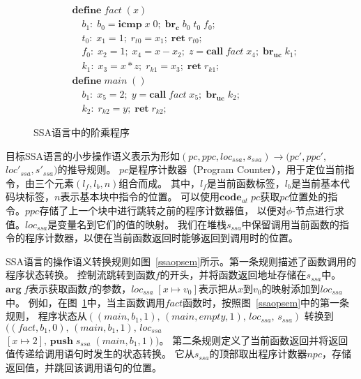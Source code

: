 \begin{figure}[ht]
    \centering
    \begin{equation}
        \nonumber
        \begin{aligned}
            & \mathbf{define}\; fact\; (x)\\
            & \quad b_1:\; b_0 = \mathbf{icmp}\; x\; 0;\; \mathbf{br_c}\; b_0\; t_0\; f_0; \\
            & \quad t_0:\; x_1 = 1;\; r_{t0} = x_1;\; \mathbf{ret}\; r_{t0}; \\
            & \quad f_0:\; x_2 = 1;\; x_4 = x - x_2;\; z = \mathbf{call}\; fact\; x_4;\; \mathbf{br_{uc}}\; k_1; \\
            & \quad k_1:\; x_3 = x*z;\; r_{k1} = x_3;\; \mathbf{ret}\; r_{k1}; \\
            & \mathbf{define}\; main\; ( )\\
            & \quad b_1:\; x_5 = 2;\; y = \mathbf{call}\; fact\; x_5;\; \mathbf{br_{uc}}\; k_2;\\
            & \quad k_2:\; r_{k2} = y;\; \mathbf{ret}\; r_{k2};
        \end{aligned}
    \end{equation}
    \caption{SSA语言中的阶乘程序}\label{factssa}
\end{figure}

目标SSA语言的小步操作语义表示为形如$(pc, ppc, loc_{ssa}, s_{ssa}) \rightarrow (pc', ppc', $ \\ $loc'_{ssa}, s'_{ssa})$的推导规则。
$pc$是程序计数器（Program Counter），用于定位当前指令，由三个元素$(l_{f}, l_b, n)$组合而成。
其中，$l_{f}$是当前函数标签，$l_b$是当前基本代码块标签，$n$表示基本块中指令的位置。
可以使用$\mathbf{code}_{at}\; pc$获取$pc$位置处的指令。$ppc$存储了上一个块中进行跳转之前的程序计数器值，
以便对$\phi$-节点进行求值。$loc_{ssa}$是变量名到它们的值的映射。
我们在堆栈$s_{ssa}$中保留调用当前函数的指令的程序计数器，以便在当前函数返回时能够返回到调用时的位置。

SSA语言的操作语义转换规则如图~\ref{ssaopsem}所示。第一条规则描述了函数调用的程序状态转换。
控制流跳转到函数$f$的开头，并将函数返回地址存储在$s_{ssa}$中。
$\mathbf{arg}\; f$表示获取函数$f$的参数，$loc_{ssa}\; [x\mapsto v_0]$表示把从$x$到$v_0$的映射添加到$loc_{ssa}$中。
例如，在图~\ref{factssa}中，当主函数调用$fact$函数时，按照图~\ref{ssaopsem}中的第一条规则，
程序状态从$((main,b_1,1),\, (main,empty,1),\, loc_{ssa},\, s_{ssa})$ 
转换到$((fact,b_1,0),\, (main,b_1,1),\, loc_{ssa}$ \\ $[x\mapsto 2],\, \mathbf{push}\; s_{ssa}\; (main,b_1,1))$。
第二条规则定义了当前函数返回并将返回值传递给调用语句时发生的状态转换。
它从$s_{ssa}$的顶部取出程序计数器$npc$，存储返回值，并跳回该调用语句的位置。

